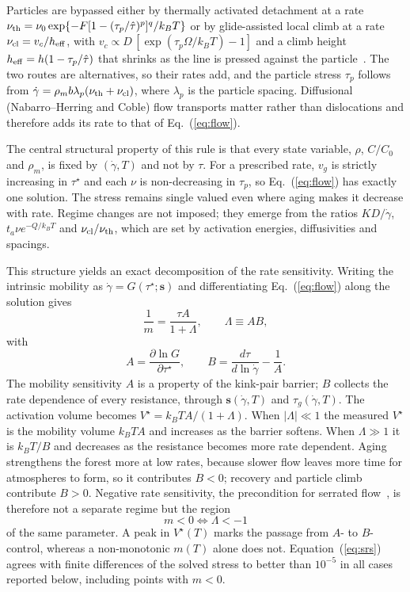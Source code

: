 \documentclass[aps,prl,twocolumn,superscriptaddress,amsmath,amssymb,floatfix]{revtex4-2}
\newcommand{\gd}{\dot\gamma}
\newcommand{\ts}{\tau^{\star}}
\newcommand{\kT}{k_BT}
\begin{document}
Particles are bypassed either by thermally activated detachment at a rate $\nu_{\rm th}=\nu_0\exp\{-F[1-(\tau_p/\hat\tau)^{p}]^{q}/\kT\}$ or by glide-assisted local climb at a rate $\nu_{\rm cl}=v_c/h_{\rm eff}$, with $v_c\propto D\,[\exp(\tau_p\Omega/\kT)-1]$ and a climb height $h_{\rm eff}=h(1-\tau_p/\hat\tau)$ that shrinks as the line is pressed against the particle~\cite{BrownHam,RoslerArzt}. The two routes are alternatives, so their rates add, and the particle stress $\tau_p$ follows from $\gd=\rho_m b\lambda_p(\nu_{\rm th}+\nu_{\rm cl})$, where $\lambda_p$ is the particle spacing. Diffusional (Nabarro--Herring and Coble) flow transports matter rather than dislocations and therefore adds its rate to that of Eq.~(\ref{eq:flow}).

The central structural property of this rule is that every state variable, $\rho$, $C/C_0$ and $\rho_m$, is fixed by $(\gd,T)$ and not by $\tau$. For a prescribed rate, $v_g$ is strictly increasing in $\ts$ and each $\nu$ is non-decreasing in $\tau_p$, so Eq.~(\ref{eq:flow}) has exactly one solution. The stress remains single valued even where aging makes it decrease with rate. Regime changes are not imposed; they emerge from the ratios $KD/\gd$, $t_a\nu e^{-Q/\kT}$ and $\nu_{\rm cl}/\nu_{\rm th}$, which are set by activation energies, diffusivities and spacings.

This structure yields an exact decomposition of the rate sensitivity. Writing the intrinsic mobility as $\gd=G(\ts;\bm s)$ and differentiating Eq.~(\ref{eq:flow}) along the solution gives
\begin{equation}
\frac1m=\frac{\tau A}{1+\Lambda},\qquad
\Lambda\equiv AB,
\label{eq:srs}
\end{equation}
with
\begin{equation}
A=\frac{\partial\ln G}{\partial\ts},\qquad
B=\frac{d\tau}{d\ln\gd}-\frac1A .
\end{equation}
The mobility sensitivity $A$ is a property of the kink-pair barrier; $B$ collects the rate dependence of every resistance, through $\bm s(\gd,T)$ and $\tau_g(\gd,T)$. The activation volume becomes $V^\star=\kT A/(1+\Lambda)$. When $|\Lambda|\ll1$ the measured $V^\star$ is the mobility volume $\kT A$ and increases as the barrier softens. When $\Lambda\gg1$ it is $\kT/B$ and decreases as the resistance becomes more rate dependent. Aging strengthens the forest more at low rates, because slower flow leaves more time for atmospheres to form, so it contributes $B<0$; recovery and particle climb contribute $B>0$. Negative rate sensitivity, the precondition for serrated flow~\cite{McCormick1988}, is therefore not a separate regime but the region
\begin{equation}
m<0\iff\Lambda<-1
\end{equation}
of the same parameter. A peak in $V^\star(T)$ marks the passage from $A$- to $B$-control, whereas a non-monotonic $m(T)$ alone does not. Equation~(\ref{eq:srs}) agrees with finite differences of the solved stress to better than $10^{-5}$ in all cases reported below, including points with $m<0$.
\end{document}
